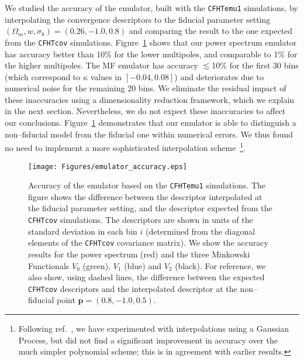 \documentclass[reprint,aps,prd,superscriptaddress,showkeys,showpacs]{revtex4-1}
\begin{document}
We studied the accuracy of the emulator, built with the
\texttt{CFHTemu1} simulations, by interpolating the convergence
descriptors to the fiducial parameter setting
$(\Omega_m,w,\sigma_8)=(0.26,-1.0,0.8)$ and comparing the result to
the one expected from the \texttt{CFHTcov}
simulations. Figure~\ref{emulatorAccuracy} shows that our power
spectrum emulator has accuracy better than 10\% for the lower
multipoles, and comparable to 1\% for the higher multipoles. The MF
emulator has accuracy $\lesssim$10\% for the first 30 bins (which
correspond to $\kappa$ values in $[-0.04,0.08]$) and deteriorates due
to numerical noise for the remaining 20 bins. We eliminate the
residual impact of these inaccuracies using a dimensionality reduction
framework, which we explain in the next section. Nevertheless, we do
not expect these inaccuracies to affect our
conclusions. Figure~\ref{emulatorAccuracy} demonstrates that our
emulator is able to distinguish a non--fiducial model from the
fiducial one within numerical errors.  We thus found no need to
implement a more sophisticated interpolation
scheme~\footnote{Following ref.~\citep{coyote2}, we have experimented
  with interpolations using a Gaussian Process, but did not find a
  significant improvement in accuracy over the much simpler polynomial
  scheme; this is in agreement with earlier results.}.


\begin{figure}
\begin{center}
\texttt{[image: Figures/emulator\_accuracy.eps]}
\end{center}
\caption{Accuracy of the emulator based on the \texttt{CFHTemu1}
  simulations. The figure shows the difference between the descriptor
  interpolated at the fiducial parameter setting, and the descriptor
  expected from the \texttt{CFHTcov} simulations. The descriptors are
  shown in units of the standard deviation in each bin $i$ (determined
  from the diagonal elements of the \texttt{CFHTcov} covariance
  matrix). We show the accuracy results for the power spectrum (red)
  and the three Minkowski Functionals $V_0$ (green), $V_1$ (blue) and
  $V_2$ (black). For reference, we also show, using dashed lines, the
  difference between the expected \texttt{CFHTcov} descriptors and the
  interpolated descriptor at the non--fiducial point $\mathbf{p}=(0.8,-1.0,0.5)$.}
\label{emulatorAccuracy}
\end{figure}  
\end{document}
